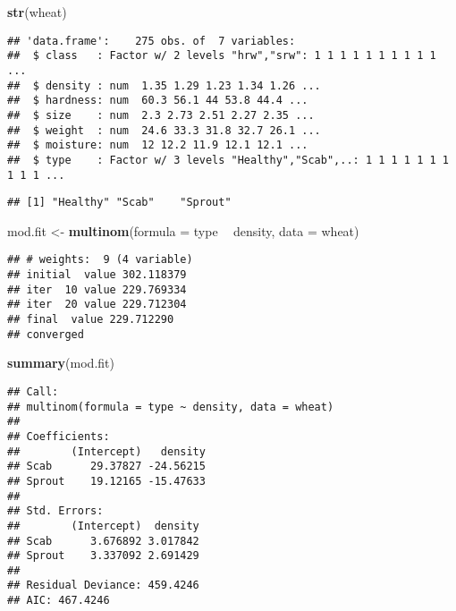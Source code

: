\documentclass[]{article}
\newenvironment{Shaded}{\begin{snugshade}}{\end{snugshade}}
\newcommand{\DataTypeTok}[1]{\textcolor[rgb]{0.13,0.29,0.53}{#1}}
\newcommand{\KeywordTok}[1]{\textcolor[rgb]{0.13,0.29,0.53}{\textbf{#1}}}
\newcommand{\NormalTok}[1]{#1}
\newcommand{\OperatorTok}[1]{\textcolor[rgb]{0.81,0.36,0.00}{\textbf{#1}}}
\newcommand{\StringTok}[1]{\textcolor[rgb]{0.31,0.60,0.02}{#1}}
\begin{document}
\begin{Shaded}
\begin{Highlighting}[]
\KeywordTok{str}\NormalTok{(wheat)}
\end{Highlighting}
\end{Shaded}

\begin{verbatim}
## 'data.frame':    275 obs. of  7 variables:
##  $ class   : Factor w/ 2 levels "hrw","srw": 1 1 1 1 1 1 1 1 1 1 ...
##  $ density : num  1.35 1.29 1.23 1.34 1.26 ...
##  $ hardness: num  60.3 56.1 44 53.8 44.4 ...
##  $ size    : num  2.3 2.73 2.51 2.27 2.35 ...
##  $ weight  : num  24.6 33.3 31.8 32.7 26.1 ...
##  $ moisture: num  12 12.2 11.9 12.1 12.1 ...
##  $ type    : Factor w/ 3 levels "Healthy","Scab",..: 1 1 1 1 1 1 1 1 1 1 ...
\end{verbatim}

\begin{Shaded}
\end{Shaded}

\begin{verbatim}
## [1] "Healthy" "Scab"    "Sprout"
\end{verbatim}

\begin{Shaded}
\begin{Highlighting}[]
\NormalTok{mod.fit <-}\StringTok{ }\KeywordTok{multinom}\NormalTok{(}\DataTypeTok{formula =}\NormalTok{ type }\OperatorTok{~}\StringTok{ }\NormalTok{density, }\DataTypeTok{data =}\NormalTok{ wheat)}
\end{Highlighting}
\end{Shaded}

\begin{verbatim}
## # weights:  9 (4 variable)
## initial  value 302.118379 
## iter  10 value 229.769334
## iter  20 value 229.712304
## final  value 229.712290 
## converged
\end{verbatim}

\begin{Shaded}
\begin{Highlighting}[]
\KeywordTok{summary}\NormalTok{(mod.fit)}
\end{Highlighting}
\end{Shaded}

\begin{verbatim}
## Call:
## multinom(formula = type ~ density, data = wheat)
## 
## Coefficients:
##        (Intercept)   density
## Scab      29.37827 -24.56215
## Sprout    19.12165 -15.47633
## 
## Std. Errors:
##        (Intercept)  density
## Scab      3.676892 3.017842
## Sprout    3.337092 2.691429
## 
## Residual Deviance: 459.4246 
## AIC: 467.4246
\end{verbatim}
\end{document}
